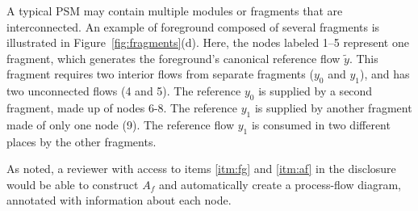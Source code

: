 A typical PSM may contain multiple modules or fragments that are interconnected.  An example of foreground composed of several fragments is illustrated in Figure~\ref{fig:fragments}(d).  Here, the nodes labeled 1--5 represent one fragment, which generates the foreground's canonical reference flow $\tilde{y}$. This fragment requires two interior flows from separate fragments ($y_0$ and $y_1$), and has two unconnected flows (4 and 5).  The reference $y_0$ is supplied by a second fragment, made up of nodes 6-8.  The reference $y_1$ is supplied by another fragment made of only one node (9). The reference flow $y_1$ is consumed in two different places by the other fragments.

As noted, a reviewer with access to items \ref{itm:fg} and \ref{itm:af} in the disclosure would be able to construct $A_f$ and automatically create a process-flow diagram, annotated with information about each node.



